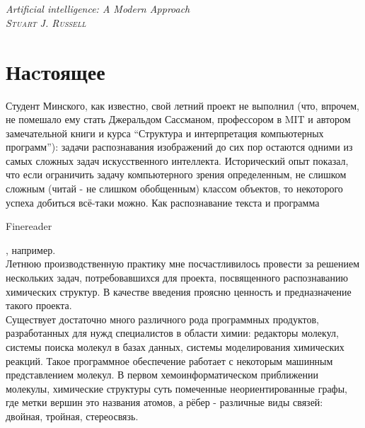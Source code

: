 





\onecolumn

\setlength{\epigraphwidth}{8cm}

\begin{epigraphs}
    \\ \\ 
	 { \tiny{ \it{Artificial intelligence: A Modern Approach} \\ \textsc{Stuart J. Russell}}}
\end{epigraphs}  

\section*{Наcтоящее}

Студент Минского, как известно, свой летний проект не выполнил (что, впрочем, не помешало ему стать
Джеральдом Сассманом, профессором в MIT и автором замечательной книги и курса ``Структура и интерпретация
компьютерных программ''): задачи распознавания изображений до сих пор остаются
одними из самых сложных задач искусственного интеллекта. Исторический опыт показал, что если ограничить задачу
компьютерного зрения определенным, не слишком сложным (читай - не слишком обобщенным) классом объектов, то некоторого
успеха добиться всё-таки можно. Как распознавание текста и программа \begin{tt}Finereader\end{tt}, например. \\

\noindent
Летнюю производственную практику мне посчастливилось провести за решением нескольких задач, потребовавшихся
для проекта, посвященного распознаванию химических структур. В качестве введения проясню ценность и предназначение
такого проекта.\\

\noindent
Существует достаточно много различного рода программных продуктов, разработанных для нужд специалистов в области химии:
редакторы молекул, системы поиска молекул в базах данных, системы моделирования химических реакций. Такое программное 
обеспечение работает с некоторым машинным представлением молекул.
В первом хемоинформатическом приближении молекулы,
химические структуры суть помеченные неориентированные графы, где метки вершин это названия атомов, а рёбер - различные
виды связей: двойная, тройная, стереосвязь. \\


